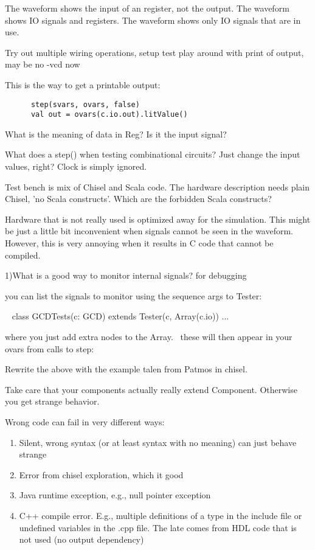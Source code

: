 \documentclass[a4paper, conference]{IEEEtran}
\begin{document}
The waveform shows the input of an register, not the output.
The waveform shows IO signals and registers.
The waveform shows only IO signals that are in use.

Try out multiple wiring operations, setup test play around with print of output, may be no -vcd now

This is the way to get a printable output:

\begin{verbatim}
      step(svars, ovars, false)
      val out = ovars(c.io.out).litValue()
\end{verbatim}


What is the meaning of data in Reg? Is it the input signal?

What does a step() when testing combinational circuits? Just change the input values, right? Clock is simply ignored.

Test bench is mix of Chisel and Scala code. The hardware description needs plain Chisel, 'no Scala constructs'. Which are the forbidden Scala constructs?

Hardware that is not really used is optimized away for the simulation.
This might be just a little bit inconvenient when signals cannot be seen in
the waveform. However, this is very annoying when it results in C code
that cannot be compiled.

1)What is a good way to monitor internal signals? for debugging

you can list the signals to monitor using the sequence args to Tester:

  class GCDTests(c: GCD) extends Tester(c, Array(c.io)) ...

where you just add extra nodes to the Array.  these will then appear in your ovars from calls to step:

Rewrite the above with the example talen from Patmos in chisel.

Take care that your components actually really extend Component. Otherwise
you get strange behavior.

Wrong code can fail in very different ways:

\begin{enumerate}
\item Silent, wrong syntax (or at least syntax with no meaning) can just behave strange
\item Error from chisel exploration, which it good
\item Java runtime exception, e.g., null pointer exception
\item C++ compile error. E.g., multiple definitions of a type in the include file or undefined
variables in the .cpp file. The late comes from HDL code that is not used (no output dependency)
\end{enumerate}
\end{document}
